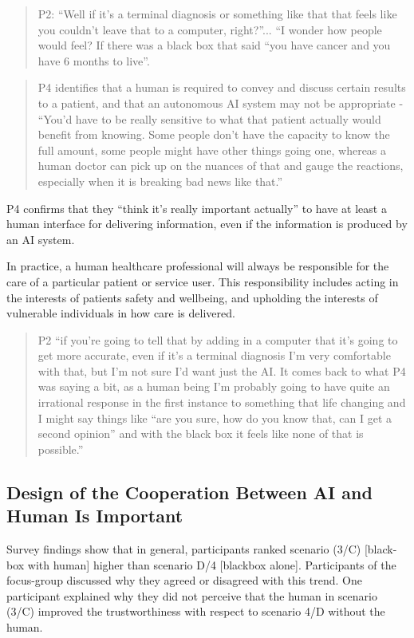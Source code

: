 \documentclass[manuscript,screen,review]{acmart}
\begin{document}
\begin{quote}
P2: “Well if it’s a terminal diagnosis or something like that that feels like you couldn’t leave that to a computer, right?”... “I wonder how people would feel? If there was a black box that said “you have cancer and you have 6 months to live”. 
\end{quote}

\begin{quote}
P4 identifies that a human is required to convey and discuss certain results to a patient, and that an autonomous AI system may not be appropriate - “You’d have to be really sensitive to what that patient actually would benefit from knowing. Some people don’t have the capacity to know the full amount, some people might have other things going one, whereas a human doctor can pick up on the nuances of that and gauge the reactions, especially when it is breaking bad news like that.” 
\end{quote}

P4 confirms that they “think it’s really important actually” to have at least a human interface for delivering information, even if the information is produced by an AI system. 

In practice, a human healthcare professional will always be responsible for the care of a particular patient or service user. This responsibility includes acting in the interests of patients safety and wellbeing, and upholding the interests of vulnerable individuals in how care is delivered. 


\begin{quote}
P2 “if you're going to tell that by adding in a computer that it’s going to get more accurate, even if it’s a terminal diagnosis I'm very comfortable with that, but I'm not sure I'd want just the AI. It comes back to what P4 was saying a bit, as a human being I'm probably going to have quite an irrational response in the first instance to something that life changing and I might say things like “are you sure, how do you know that, can I get a second opinion” and with the black box it feels like none of that is possible.”
\end{quote}


\subsection{Design of the Cooperation Between AI and Human Is Important}
Survey findings show that in general, participants ranked scenario (3/C) [black-box with human] higher than scenario D/4 [blackbox alone]. 
Participants of the focus-group discussed why they agreed or disagreed with this trend. One participant explained why they did not perceive that the human in scenario (3/C) improved the trustworthiness with respect to scenario 4/D without the human. 
\end{document}
